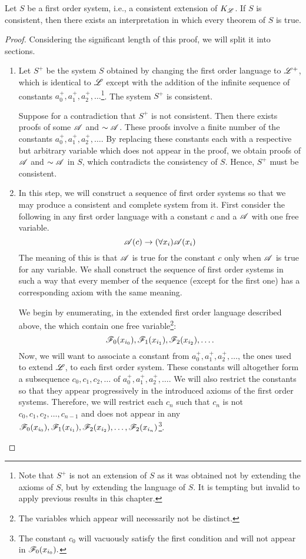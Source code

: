   \begin{proposition}
    Let \(S\) be a first order system, i.e., a consistent extension of \(K_{\mathscr{L}}\). If \(S\) is consistent, then there exists an interpretation in which every theorem of \(S\) is true.

    \begin{proof}
      Considering the significant length of this proof, we will split it into sections.

      \begin{enumerate}
        \item Let \(S^+\) be the system \(S\) obtained by changing the first order language to \(\mathscr{L}^+\), which is identical to \(\mathscr{L}\) except with the addition of the infinite sequence of constants \(a_0^+, a_1^+, a_2^+, \dots\)\footnote{Note that \(S^+\) is not an extension of \(S\) as it was obtained not by extending the axioms of \(S\), but by extending the language of \(S\). It is tempting but invalid to apply previous results in this chapter.}. The system \(S^+\) is consistent.

        Suppose for a contradiction that \(S^+\) is not consistent. Then there exists proofs of some \wfs{} \(\mathscr{A}\) and \(\sim\mathscr{A}\). These proofs involve a finite number of the constants \(a_0^+, a_1^+, a_2^+, \dots\). By replacing these constants each with a respective but arbitrary variable which does not appear in the proof, we obtain proofs of \(\mathscr{A}\) and \(\sim\mathscr{A}\) in \(S\), which contradicts the consistency of \(S\). Hence, \(S^+\) must be consistent.

        \item In this step, we will construct a sequence of first order systems so that we may produce a consistent and complete system from it. First consider the following \wf{} in any first order language with a constant \(c\) and a \wf{} \(\mathscr{A}\) with one free variable.
        \[\mathscr{A}(c) \rightarrow (\forall x_i)\mathscr{A}(x_i)\]
        The meaning of this \wf{} is that \(\mathscr{A}\) is true for the constant \(c\) only when \(\mathscr{A}\) is true for any variable. We shall construct the sequence of first order systems in such a way that every member of the sequence (except for the first one) has a corresponding axiom with the same meaning. 

        We begin by enumerating, in the extended first order language described above, the \wfs{} which contain one free variable\footnote{The variables which appear will necessarily not be distinct.}:
        \[\mathscr{F}_0(x_{i_0}), \mathscr{F}_1(x_{i_1}), \mathscr{F}_2(x_{i_2}), \dots.\]
        Now, we will want to associate a constant from \(a_0^+, a_1^+, a_2^+, \dots\), the ones used to extend \(\mathscr{L}\), to each first order system. These constants will altogether form a subsequence \(c_0, c_1, c_2, \dots\) of \(a_0^+, a_1^+, a_2^+, \dots\). We will also restrict the constants so that they appear progressively in the introduced axioms of the first order systems. Therefore, we will restrict each \(c_n\) such that \(c_n\) is not \(c_0, c_1, c_2, \dots, c_{n-1}\) and does not appear in any \(\mathscr{F}_0(x_{i_0}), \mathscr{F}_1(x_{i_1}), \mathscr{F}_2(x_{i_2}), \dots, \mathscr{F}_2(x_{i_{n}})\)\footnote{The constant \(c_0\) will vacuously satisfy the first condition and will not appear in \(\mathscr{F}_0(x_{i_0}).\)}.


\end{enumerate}
\end{proof}
\end{proposition}
